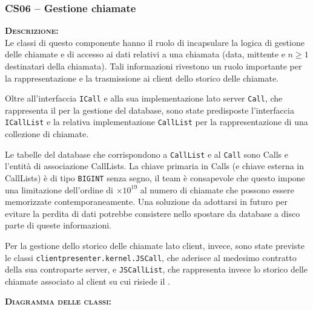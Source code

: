 \subsubsection{CS06 -- Gestione chiamate}
\begin{description}
  \item{\scshape\bfseries Descrizione:}\\
Le classi di questo componente hanno il ruolo di incapsulare la logica di gestione delle chiamate e di accesso ai dati relativi a una chiamata (data, mittente e $n\geq1$ destinatari della chiamata). Tali informazioni rivestono un ruolo importante per la rappresentazione e la trasmissione ai client dello storico delle chiamate.

Oltre all'interfaccia \texttt{ICall} e alla sua implementazione lato server \texttt{Call}, che rappresenta il  per la gestione del database, sono state predisposte l'interfaccia \texttt{ICallList} e la relativa implementazione \texttt{CallList} per la rappresentazione di una collezione di chiamate.

Le tabelle del database che corrispondono a \texttt{CallList} e al  \texttt{Call} sono Calls e l'entità di associazione CallLists. La chiave primaria in Calls (e chiave esterna in CallLists) è di tipo \texttt{BIGINT} senza segno, il team è consapevole che questo impone una limitazione dell'ordine di $\times10^{19}$ al numero di chiamate che possono essere memorizzate contemporaneamente. Una soluzione da adottarsi in futuro per evitare la perdita di dati potrebbe consistere nello spostare da database a disco parte di queste informazioni.

Per la gestione dello storico delle chiamate lato client, invece, sono state previste le classi \texttt{clientpresenter.kernel.JSCall}, che aderisce al medesimo contratto della sua controparte server, e \texttt{JSCallList}, che rappresenta invece lo storico delle chiamate associato al client su cui risiede il .

  \item{\scshape\bfseries Diagramma delle classi:}


\end{description}
